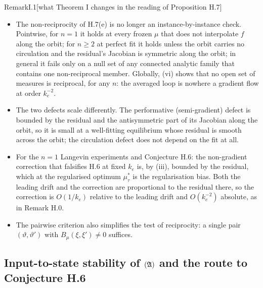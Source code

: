 \begin{rmk}{Remark}{I.1}[what Theorem I changes in the reading of Proposition H.7]\mbox{}
\begin{itemize}
  \item The non-reciprocity of H.7(e) is no longer an instance-by-instance check. Pointwise, for $n=1$ it holds at
    every frozen $\mu$ that does not interpolate $f$ along the orbit; for $n\ge2$ at perfect fit it holds unless the
    orbit carries no circulation and the residual's Jacobian is symmetric along the orbit; in general it fails only on
    a null set of any connected analytic family that contains one non-reciprocal member. Globally, (vi) shows that no
    open set of measures is reciprocal, for any $n$: the averaged loop is nowhere a gradient flow at order $k_e^{-2}$.
  \item The two defects scale differently. The performative (semi-gradient) defect is bounded by the residual and the
    antisymmetric part of its Jacobian along the orbit, so it is small at a well-fitting equilibrium whose residual is
    smooth across the orbit; the circulation defect does not depend on the fit at all.
  \item For the $n=1$ Langevin experiments and Conjecture H.6: the non-gradient correction that falsifies H.6 at
    fixed $k_e$ is, by (iii), bounded by the residual, which at the regularised optimum $\mu^*_\tau$ is the
    regularisation bias. Both the leading drift and the correction are proportional to the residual there, so the
    correction is $O(1/k_e)$ relative to the leading drift and $O(k_e^{-2})$ absolute, as in Remark H.0.
  \item The pairwise criterion also simplifies the test of reciprocity: a single pair $(\vartheta,\vartheta')$ with
    $B_\mu(\xi,\xi')\neq0$ suffices.
\end{itemize}
\end{rmk}

\subsection{Input-to-state stability of \texorpdfstring{$(\mathfrak{A})$}{(A)} and the route to Conjecture H.6}

